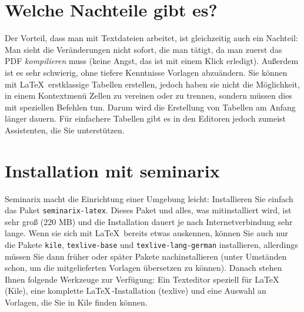 \documentclass[a4paper,10pt]{scrartcl}
\begin{document}
\section*{Welche Nachteile gibt es?}
Der Vorteil, dass man mit Textdateien arbeitet, ist gleichzeitig auch ein Nachteil: Man sieht die Veränderungen nicht sofort, die man tätigt, da man zuerst das PDF \emph{kompilieren} muss (keine Angst, das ist mit einem Klick erledigt). Außerdem ist es sehr schwierig, ohne tiefere Kenntnisse Vorlagen abzuändern. Sie können mit \LaTeX \, erstklassige Tabellen erstellen, jedoch haben sie nicht die Möglichkeit, in einem Kontextmenü Zellen zu vereinen oder zu trennen, sondern müssen dies mit speziellen Befehlen tun. Darum wird die Erstellung von Tabellen am Anfang länger dauern. Für einfachere Tabellen gibt es in den Editoren jedoch zumeist Assistenten, die Sie unterstützen.

\section*{Installation mit seminarix}
Seminarix macht die Einrichtung einer Umgebung leicht: Installieren Sie einfach das Paket \texttt{seminarix-latex}. Dieses Paket und alles, was mitinstalliert wird, ist sehr groß (220 MB) und die Installation dauert je nach Internetverbindung sehr lange. Wenn sie sich mit \LaTeX\ bereits etwas auskennen, können Sie auch nur die Pakete \texttt{kile}, \texttt{texlive-base} und \texttt{texlive-lang-german} installieren, allerdings müssen Sie dann früher oder später Pakete nachinstallieren (unter Umständen schon, um die mitgelieferten Vorlagen übersetzen zu können). Danach stehen Ihnen folgende Werkzeuge zur Verfügung: Ein Texteditor speziell für \LaTeX \, (Kile), eine komplette \LaTeX \,-Installation (texlive) und eine Auswahl an Vorlagen, die Sie in Kile finden können.
\end{document}
